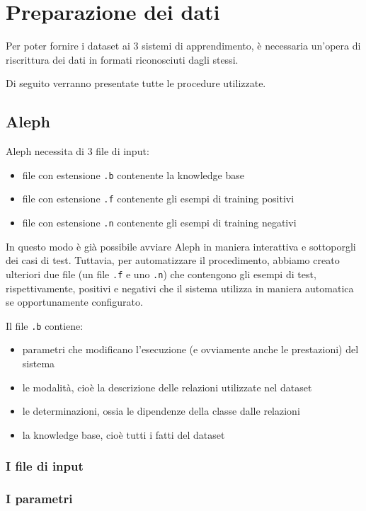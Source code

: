 \section{Preparazione dei dati}
Per poter fornire i dataset ai 3 sistemi di apprendimento, è necessaria un'opera di riscrittura dei dati in formati riconosciuti dagli stessi.

Di seguito verranno presentate tutte le procedure utilizzate.


\subsection{Aleph}
Aleph necessita di 3 file di input:
\begin{itemize}
\item file con estensione \verb+.b+ contenente la knowledge base
\item file con estensione \verb+.f+ contenente gli esempi di training positivi
\item file con estensione \verb+.n+ contenente gli esempi di training negativi
\end{itemize}

In questo modo è già possibile avviare Aleph in maniera interattiva e sottoporgli dei casi di test. Tuttavia, per automatizzare il procedimento, abbiamo creato ulteriori due file (un file \verb+.f+ e uno \verb+.n+) che contengono gli esempi di test, rispettivamente, positivi e negativi che il sistema utilizza in maniera automatica se opportunamente configurato.

Il file \verb+.b+ contiene:
\begin{itemize}
\item parametri che modificano l'esecuzione (e ovviamente anche le prestazioni) del sistema
\item le modalità, cioè la descrizione delle relazioni utilizzate nel dataset
\item le determinazioni, ossia le dipendenze della classe dalle relazioni
\item la knowledge base, cioè tutti i fatti del dataset
\end{itemize}

\subsubsection{I file di input}

\subsubsection*{I parametri}

